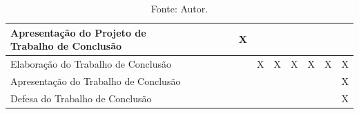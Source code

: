 \begin{table}[H]
\begin{tabular}{|p{5.5cm}|c|c|c|c|c|c|c|c|c|c|c|c|}
        \hline
        Apresentação do Projeto de Trabalho de Conclusão &                                    &             &             &             &             & X           &             &             &             &             &             &             \\
        \hline
        Elaboração do Trabalho de Conclusão              &                                    &             &             &             &             &             & X           & X           & X           & X           & X           & X           \\
        \hline
        Apresentação do Trabalho de Conclusão            &                                    &             &             &             &             &             &             &             &             &             &             & X           \\
        \hline
        Defesa do Trabalho de Conclusão                  &                                    &             &             &             &             &             &             &             &             &             &             & X           \\
        \hline
    \end{tabular}
    \caption*{Fonte: Autor.}
\end{table}
